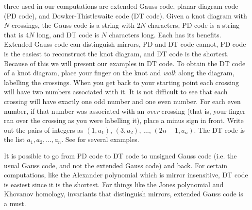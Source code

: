 \documentclass{article}
\theoremstyle{plain}
\begin{document}
        three used in our computations are extended Gauss code, planar diagram
        code (PD code), and Dowker-Thistlewaite code (DT code). Given a knot
        diagram with $N$ crossings, the Gauss code is a string with $2N$
        characters, PD code is a string that is $4N$ long, and DT code is $N$
        characters long. Each has its benefits. Extended Gauss code can
        distinguish mirrors, PD and DT code cannot, PD code is the easiest to
        reconstruct the knot diagram, and DT code is the shortest. Because of
        this we will present our examples in DT code. To obtain the DT code of
        a knot diagram, place your finger on the knot and \textit{walk} along
        the diagram, labelling the crossings. When you get back to your starting
        point each crossing will have two numbers associated with it. It is
        not difficult to see that each crossing will have exactly one odd number
        and one even number. For each even number, if that number was associated
        with an \textit{over} crossing (that is, your finger ran over the
        crossing as you were labelling it), place a minus sign in front. Write
        out the pairs of integers as $(1,a_{1})$, $(3,a_{2})$, $\dots$,
        $(2n-1,a_{n})$. The DT code is the list $a_{1},a_{2},\dots,a_{n}$.
        See \cite{KatlasDTCode} for several examples.
        \par\hfill\par
        It is possible to go from PD code to DT code to unsigned
        Gauss code (i.e. the usual Gauss code, and not the extended Gauss code)
        and back. For certain computations, like the Alexander polynomial which
        is mirror insensitive, DT code is easiest since it is the shortest.
        For things like the Jones polynomial and Khovanov homology, invariants
        that distinguish mirrors, extended Gauss code is a must.
\end{document}

